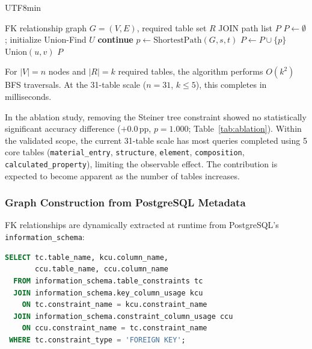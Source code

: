 \documentclass[sn-mathphys,Numbered]{sn-jnl}
\begin{document}
\begin{CJK}{UTF8}{min}
\begin{algorithm}[htbp]
  \caption{Minimum covering JOIN subgraph (Steiner tree approximation).}
  \label{alg:steiner}
  \begin{algorithmic}[1]
    \Require FK relationship graph $G = (V, E)$, required table set $R$
    \Ensure JOIN path list $P$
    \State $P \gets \emptyset$; initialize Union-Find $U$
        \State \textbf{continue}
      \EndIf
      \State $p \gets \text{ShortestPath}(G, s, t)$ 
        \State $P \gets P \cup \{p\}$
          \State $\text{Union}(u, v)$
        \EndFor
      \EndIf
    \EndFor
    \State \Return $P$
  \end{algorithmic}
\end{algorithm}

For $|V| = n$ nodes and $|R| = k$ required tables,
the algorithm performs $O(k^2)$ BFS traversals.
At the 31-table scale ($n = 31$, $k \leq 5$), this completes in milliseconds.

In the ablation study, removing the Steiner tree constraint showed
no statistically significant accuracy difference ($+$0.0\,pp, $p=1.000$;
Table~\ref{tab:ablation}).
Within the validated scope, the current 31-table scale has most queries
completed using 5 core tables
(\texttt{material\_entry}, \texttt{structure}, \texttt{element},
\texttt{composition}, \texttt{calculated\_property}),
limiting the observable effect.
The contribution is expected to become apparent as the number of tables increases.

\subsubsection{Graph Construction from PostgreSQL Metadata}

FK relationships are dynamically extracted at runtime from
PostgreSQL's \texttt{information\_schema}:

\begin{lstlisting}[language=SQL,caption={FK relationship extraction},label=lst:fk_query,numbers=none]
SELECT tc.table_name, kcu.column_name,
       ccu.table_name, ccu.column_name
  FROM information_schema.table_constraints tc
  JOIN information_schema.key_column_usage kcu
    ON tc.constraint_name = kcu.constraint_name
  JOIN information_schema.constraint_column_usage ccu
    ON ccu.constraint_name = tc.constraint_name
 WHERE tc.constraint_type = 'FOREIGN KEY';
\end{lstlisting}


\end{CJK}
\end{document}
